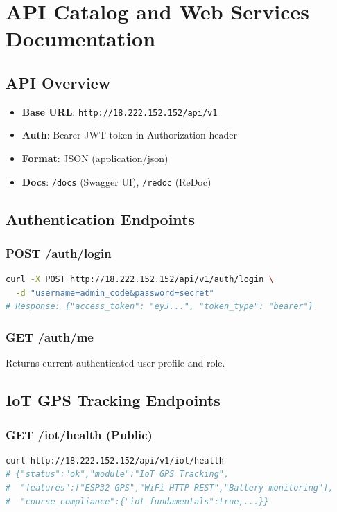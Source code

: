 \documentclass[12pt,a4paper]{report}
\begin{document}
\chapter{API Catalog and Web Services Documentation}

\section{API Overview}
\begin{itemize}
    \item \textbf{Base URL}: \texttt{http://18.222.152.152/api/v1}
    \item \textbf{Auth}: Bearer JWT token in Authorization header
    \item \textbf{Format}: JSON (application/json)
    \item \textbf{Docs}: \texttt{/docs} (Swagger UI), \texttt{/redoc} (ReDoc)
\end{itemize}

\section{Authentication Endpoints}

\subsection{POST /auth/login}
\begin{lstlisting}[language=bash]
curl -X POST http://18.222.152.152/api/v1/auth/login \
  -d "username=admin_code&password=secret"
# Response: {"access_token": "eyJ...", "token_type": "bearer"}
\end{lstlisting}

\subsection{GET /auth/me}
Returns current authenticated user profile and role.

\section{IoT GPS Tracking Endpoints}

\subsection{GET /iot/health (Public)}
\begin{lstlisting}[language=bash]
curl http://18.222.152.152/api/v1/iot/health
# {"status":"ok","module":"IoT GPS Tracking",
#  "features":["ESP32 GPS","WiFi HTTP REST","Battery monitoring"],
#  "course_compliance":{"iot_fundamentals":true,...}}
\end{lstlisting}
\end{document}
